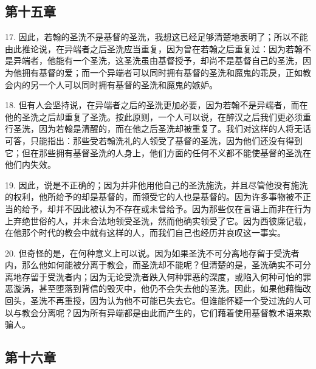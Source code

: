 
\subsection{第十五章}

17. 因此，若翰的圣洗不是基督的圣洗，我想这已经足够清楚地表明了；所以不能由此推论说，在异端者之后圣洗应当重复，因为曾在若翰之后重复过：因为若翰不是异端者，他能有一个圣洗，这圣洗虽由基督授予，却尚不是基督自己的圣洗，因为他拥有基督的爱；而一个异端者可以同时拥有基督的圣洗和魔鬼的乖戾，正如教会内的另一个人可以同时拥有基督的圣洗和魔鬼的嫉妒。\par

18. 但有人会坚持说，在异端者之后的圣洗更加必要，因为若翰不是异端者，而在他的圣洗之后却重复了圣洗。按此原则，一个人可以说，在醉汉之后我们更必须重行圣洗，因为若翰是清醒的，而在他之后圣洗却被重复了。我们对这样的人将无话可答，只能指出：那些受若翰洗礼的人领受了基督的圣洗，因为他们还没有得到它；但在那些拥有基督圣洗的人身上，他们方面的任何不义都不能使基督的圣洗在他们内失效。\par

19. 因此，说是不正确的；因为并非他用他自己的圣洗施洗，并且尽管他没有施洗的权利，他所给予的却是基督的，而领受它的人也是基督的。因为许多事物被不正当的给予，却并不因此被认为不存在或未曾给予。因为那些仅在言语上而非在行为上弃绝世俗的人，并未合法地领受圣洗，然而他确实领受了它。因为西彼廉记载，在他那个时代的教会中就有这样的人，而我们自己也经历并哀叹这一事实。\par

20. 但奇怪的是，在何种意义上可以说。因为如果圣洗不可分离地存留于受洗者内，那么他如何能被分离于教会，而圣洗却不能呢？但清楚的是，圣洗确实不可分离地存留于受洗者内；因为无论受洗者跌入何种罪恶的深度，或陷入何种可怕的罪恶漩涡，甚至堕落到背信的毁灭中，他仍不会失去他的圣洗。因此，如果他藉悔改回头，圣洗不再重授，因为认为他不可能已失去它。但谁能怀疑一个受过洗的人可以与教会分离呢？因为所有异端都是由此而产生的，它们藉着使用基督教术语来欺骗人。\par


\subsection{第十六章}


